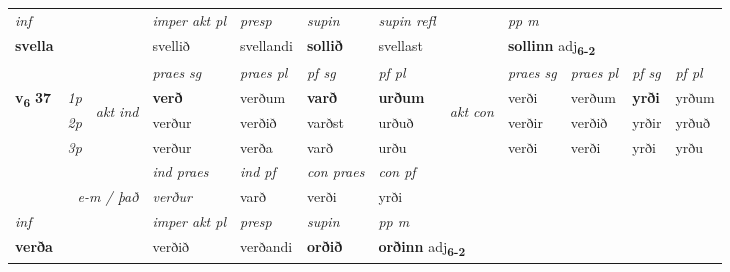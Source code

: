 \begin{longtable}[l]{X>{\footnotesize\itshape}llXXXXlXXXX}
   {\textit{inf}} & &  & \textit{imper akt pl}   & \textit{presp} & \textit{supin} & \textit{supin refl} && \textit{pp m} \\*
  {\textbf{svella}} & &  & svellið   & svellandi &  \textbf{sollið} & svellast && \multicolumn{2}{l}{\textbf{sollinn} adj\textbf{\textsubscript{6-2}}} \\*

\midrule

 & &   & \textit{praes sg}  & \textit{praes pl}    & \textit{ pf sg} & \textit{pf pl} & & \textit{praes sg}  & \textit{praes pl}    & \textit{pf sg} & \textit{pf pl }  \\ \cmidrule{4-7} \cmidrule{9-12}
 \multirow{2}{*}{{{\textbf{v{\textsubscript{6}}} \Large{\textbf{37}}}}}  & 1p & \multirow{3}{*}{\begin{turn}{90}\textit{akt ind}\end{turn}} & \textbf{verð} & verðum & \textbf{varð} & \textbf{urðum} & \multirow{3}{*}{\begin{turn}{90}\textit{akt con}\end{turn}} &verði & verðum & \textbf{yrði} & yrðum\\*
 & 2p &  &  verður  & verðið & varðst & urðuð & & verðir & verðið & yrðir & yrðuð \\*
 & 3p &  & verður & verða & varð & urðu & & verði & verði& yrði & yrðu \\*
\cmidrule{4-7} \cmidrule{9-12}

   && &  \textit{ind praes} & \textit{ind pf} & \textit{con praes} & \textit{con pf} \\*
\multicolumn{3}{r}{\textit{e-m / það}} & verður & varð & verði & yrði \\*

\cmidrule{4-7}
   {\textit{inf}} & &  & \textit{imper akt pl}   & \textit{presp} & \textit{supin}  & \textit{pp m} \\*
  {\textbf{verða}} & &  & verðið   & verðandi &  \textbf{orðið}  & \multicolumn{2}{l}{\textbf{orðinn} adj\textbf{\textsubscript{6-2}}} \\*

\midrule


\end{longtable}
